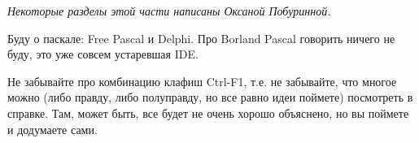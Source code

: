 
{\raggedleft\it
Некоторые разделы этой части написаны Оксаной Побуринной.
\par}





Буду о паскале: Free Pascal и Delphi. Про Borland Pascal говорить ничего не буду, это уже совсем 
устаревшая IDE.

Не забывайте про комбинацию клафиш Ctrl-F1, т.е. не забывайте, что многое можно (либо 
правду, либо полуправду, но все равно идеи поймете) посмотреть в справке. Там, может быть, все 
будет не очень хорошо объяснено, но вы поймете и додумаете сами.














